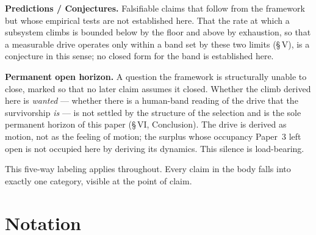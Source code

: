 \documentclass[11pt,oneside]{report}
\theoremstyle{definition}
\theoremstyle{remark}
\begin{document}
\textbf{Predictions / Conjectures.} Falsifiable claims that follow from the
framework but whose empirical tests are not established here. That the rate at which
a subsystem climbs is bounded below by the floor and above by exhaustion, so that
a measurable drive operates only within a band set by these two limits (\S\,V), is
a conjecture in this sense; no closed form for the band is established here.

\textbf{Permanent open horizon.} A question the framework is structurally unable to
close, marked so that no later claim assumes it closed. Whether the climb derived
here is \emph{wanted} --- whether there is a human-band reading of the drive that
the survivorship \emph{is} --- is not settled by the structure of the selection and
is the sole permanent horizon of this paper (\S\,VI, Conclusion). The drive is
derived as motion, not as the feeling of motion; the surplus whose occupancy
Paper~3 left open is not occupied here by deriving its dynamics. This silence is
load-bearing.

This five-way labeling applies throughout. Every claim in the body falls into
exactly one category, visible at the point of claim.

\section*{Notation}
\end{document}
